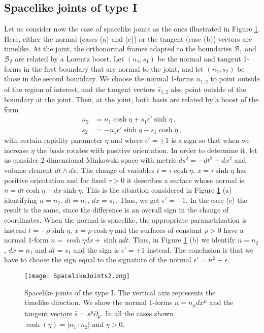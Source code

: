 \documentclass[11pt,letterpaper]{article}
\begin{document}
\subsection{Spacelike joints of type I}\label{23}
Let us consider now the case of spacelike joints as the ones illustrated in Figure \ref{Splj}. Here, either the normal  (cases (a) and (c)) or the tangent (case (b)) vectors are timelike. At the joint, the orthonormal frames adapted to the boundaries $\mathcal{B}_1$ and $\mathcal{B}_2$ are related by a Lorentz boost.  Let $(n_1, s_1)$ be the normal and tangent 1-forms in the first boundary that are normal to the joint, and let $(n_2, s_2)$ be those in the second boundary. We choose the normal 1-forms $n_{1,2}$ to point outside of the region of interest, and the tangent vectors $\hat s_{1,2}$ also point outside of the boundary at the joint. 
Then, at the joint, both basis are related by a boost of the form
\begin{equation}\label{boost}
\begin{aligned}
n_2&=n_1 \cosh\eta +s_1\epsilon' \sinh \eta \, ,\\
s_2&=- n_1 \epsilon' \sinh\eta -s_1 \cosh \eta \, ,
\end{aligned}
\end{equation}
with certain rapidity parameter $\eta$ and where $\epsilon'=\pm1$ is a sign so that when we increase $\eta$ the basis rotates with positive orientation. In order to determine it, let us consider 2-dimensional Minkowski space with metric $ds^2=-dt^2+dx^2$ and volume element $dt\wedge dx$. The change of variables $t=\tau \cosh\eta$, $x=\tau \sinh\eta$ has positive orientation and for fixed $\tau>0$ it describes a surface whose normal is $n=dt \cosh\eta-dx \sinh\eta$. This is the situation considered in Figure \ref{Splj} (a) identifying $n=n_2$, $dt=n_1$, $dx=s_1$. Thus, we get $\epsilon'=-1$. In the case (c) the result is the same, since the difference is an overall sign in the change of coordinates. When the normal is spacelike, the appropriate parametrization is instead $t=-\rho \sinh\eta$, $x=\rho \cosh\eta$ and the surfaces of constant $\rho>0$ have a normal 1-form $n=\cosh\eta dx+\sinh \eta dt$. Thus, in Figure \ref{Splj} (b) we identify $n=n_2$, $dx=n_1$ and $dt=s_1$ and the sign is $\epsilon'=+1$ instead. The conclusion is that we have to choose the sign equal to the signature of the normal $\epsilon'=n^2\equiv \epsilon$.
\begin{figure}[t]
  \centering
   \texttt{[image: SpacelikeJoints2.png]}
  \caption{\small Spacelike joints of the type I. The vertical axis represents the timelike direction. We show the normal 1-forms $n=n_{\mu}dx^{\mu}$ and the tangent vectors $\hat s=s^{\mu}\partial_{\mu}$. In all the cases shown $\cosh(\eta)=|n_1\cdot n_2|$ and $\eta>0$.}
  \label{Splj}
\end{figure}
\end{document}
